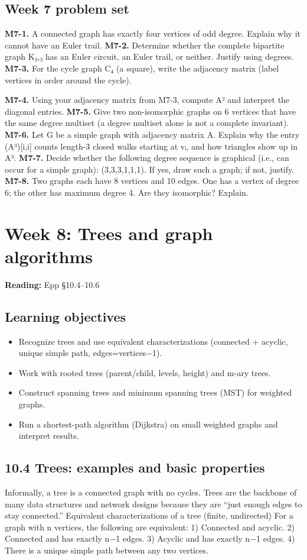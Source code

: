 \documentclass[11pt]{article}
\begin{document}
\subsection*{Week 7 problem set}
\textbf{M7-1.} A connected graph has exactly four vertices of odd degree. Explain why it cannot
have an Euler trail.
\textbf{M7-2.} Determine whether the complete bipartite graph K₃,₃ has an Euler circuit, an Euler
trail, or neither. Justify using degrees.
\textbf{M7-3.} For the cycle graph C₄ (a square), write the adjacency matrix (label vertices in
order around the cycle).

\textbf{M7-4.} Using your adjacency matrix from M7-3, compute A² and interpret the diagonal
entries.
\textbf{M7-5.} Give two non-isomorphic graphs on 6 vertices that have the same degree multiset
(a degree multiset alone is not a complete invariant).
\textbf{M7-6.} Let G be a simple graph with adjacency matrix A. Explain why the entry (A³)[i,i]
counts length-3 closed walks starting at vᵢ, and how triangles show up in A³.
\textbf{M7-7.} Decide whether the following degree sequence is graphical (i.e., can occur for a
simple graph): (3,3,3,1,1,1). If yes, draw such a graph; if not, justify.
\textbf{M7-8.} Two graphs each have 8 vertices and 10 edges. One has a vertex of degree 6; the
other has maximum degree 4. Are they isomorphic? Explain.

\clearpage
\section{Week 8: Trees and graph algorithms}
\textbf{Reading:} Epp §10.4–10.6
\subsection*{Learning objectives}
\begin{itemize}[leftmargin=*,itemsep=0.25em]
\item Recognize trees and use equivalent characterizations (connected + acyclic, unique simple path, edges=vertices−1).
\item Work with rooted trees (parent/child, levels, height) and m-ary trees.
\item Construct spanning trees and minimum spanning trees (MST) for weighted graphs.
\item Run a shortest-path algorithm (Dijkstra) on small weighted graphs and interpret results.
\end{itemize}
\subsection{10.4 Trees: examples and basic properties}
Informally, a tree is a connected graph with no cycles. Trees are the backbone of many
data structures and network designs because they are “just enough edges to stay
connected.”
Equivalent characterizations of a tree (finite, undirected)
For a graph with n vertices, the following are equivalent:
1) Connected and acyclic.
2) Connected and has exactly n−1 edges.
3) Acyclic and has exactly n−1 edges.
4) There is a unique simple path between any two vertices.
\end{document}
